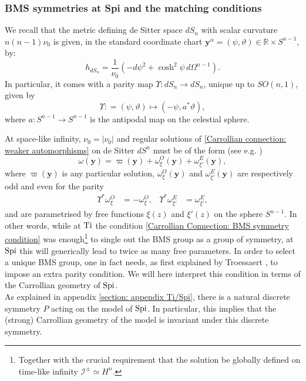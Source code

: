 \documentclass[a4paper, 10pt]{article}
\theoremstyle{remark}
\newcommand{\Ti}{\textnormal{Ti}}
\newcommand{\Spi}{\textnormal{Spi}}
\newcommand{\y}{\bm{y}}
\begin{document}
\subsubsection{BMS symmetries at Spi and the matching conditions}

We recall that the metric defining de Sitter space $dS_n$ with scalar curvature $n (n-1) \nu_0$ is given, in the standard coordinate chart $\y^{\alpha}= (\psi,\vartheta)\in \mathbb{R}\times S^{n-1}$, by:
\[h_{dS_n}=\frac{1}{\nu_0}\left( -d\psi^2 + \cosh^2\psi \,d\Omega^{n-1}\right).\]
In particular, it comes with a parity map $\Upsilon:  dS_n \to dS_n$, unique up to $SO(n,1)$, given by
\begin{equation}
 \Upsilon:   = (\psi , \vartheta) \mapsto (-\psi , a^*\vartheta),
\end{equation}
where $a: S^{n-1} \to S^{n-1}$ is the antipodal map on the celestial sphere.

At space-like infinity, $\nu_0=|\nu_0|$ and regular solutions of \eqref{Carrollian connection: weaker automorphisms} on de Sitter $dS^n$ must be of the form (see e.g. \cite{Henneaux:2018mgn,Compere:2023qoa})
\begin{equation}\label{Carrollian connection: BMS at Spi}
    \omega(\y) = \varpi(\y) + \omega^O_{\xi}(\y) +\omega^E_{\xi'}(\y),
\end{equation}
where $\varpi(\y)$ is any particular solution, $\omega^O_{\xi}(\y)$ and $\omega^E_{\xi'}(\y)$ are respectively odd and even for the parity
\begin{align*}
    \Upsilon^* \omega^O_{\xi} &= - \omega^O_{\xi}, & \Upsilon^* \omega^E_{\xi'} &= \omega^E_{\xi'},
\end{align*}
and are parametrised by free functions $\xi(z)$ and $\xi'(z)$ on the sphere $S^{n-1}$. In other words, while at $\Ti$ the condition \eqref{Carrollian Connection: BMS symmetry condition} was enough\footnote{Together with the crucial requirement that the solution be globally defined on time-like infinity $\mathcal{I}^{\pm} \simeq H^n$.} to single out the BMS group as a group of symmetry, at $\Spi$ this will generically lead to twice as many free parameters. In order to select a unique BMS group, one in fact needs, as first explained by Troessaert \cite{troessaert_bms4_2018}, to impose an extra parity condition. We will here interpret this condition in terms of the Carrollian geometry of $\Spi$.\\

As explained in appendix \ref{section: appendix Ti/Spi}, there is a natural discrete symmetry $P$ acting on the model of $\Spi$. In particular, this implies that the (strong) Carrollian geometry of the model is invariant under this discrete symmetry.  
\end{document}
